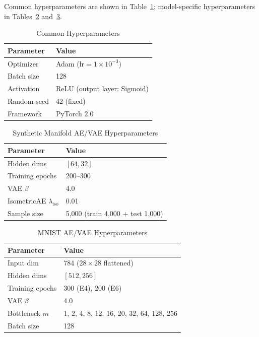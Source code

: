 \documentclass[12pt,a4paper]{article}
\begin{document}
Common hyperparameters are shown in Table~\ref{tab:common_hp}; model-specific hyperparameters in Tables~\ref{tab:synthetic_hp} and~\ref{tab:mnist_hp}.

\begin{table}[H]
\centering
\caption{Common Hyperparameters}
\label{tab:common_hp}
\begin{tabular}{ll}
\toprule
Parameter & Value \\
\midrule
Optimizer & Adam ($\mathrm{lr} = 1\times10^{-3}$) \\
Batch size & 128 \\
Activation & ReLU (output layer: Sigmoid) \\
Random seed & 42 (fixed) \\
Framework & PyTorch 2.0 \\
\bottomrule
\end{tabular}
\end{table}

\begin{table}[H]
\centering
\caption{Synthetic Manifold AE/VAE Hyperparameters}
\label{tab:synthetic_hp}
\begin{tabular}{ll}
\toprule
Parameter & Value \\
\midrule
Hidden dims & $[64, 32]$ \\
Training epochs & 200--300 \\
VAE $\beta$ & 4.0 \\
IsometricAE $\lambda_{\mathrm{iso}}$ & 0.01 \\
Sample size & 5{,}000 (train 4{,}000 + test 1{,}000) \\
\bottomrule
\end{tabular}
\end{table}

\begin{table}[H]
\centering
\caption{MNIST AE/VAE Hyperparameters}
\label{tab:mnist_hp}
\begin{tabular}{ll}
\toprule
Parameter & Value \\
\midrule
Input dim & 784 ($28\times28$ flattened) \\
Hidden dims & $[512, 256]$ \\
Training epochs & 300 (E4), 200 (E6) \\
VAE $\beta$ & 4.0 \\
Bottleneck $m$ & 1, 2, 4, 8, 12, 16, 20, 32, 64, 128, 256 \\
Batch size & 128 \\
\bottomrule
\end{tabular}
\end{table}
\end{document}
